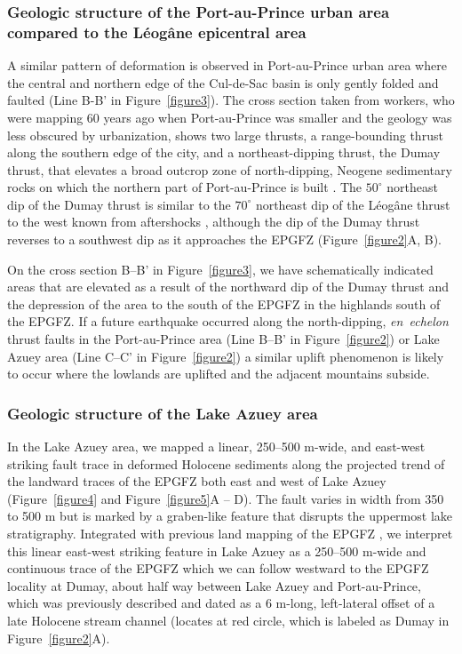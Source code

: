 \documentclass[linenumbers,draft]{agujournal}
\begin{document}
\subsubsection{Geologic structure of the Port-au-Prince urban area compared to the L\'eog\^ane epicentral area} 
A similar pattern of deformation is observed in Port-au-Prince urban area where the central and northern edge of the Cul-de-Sac basin is only gently folded and faulted \citep{massoni1955haiti,cox2011shear,mchugh2011offshore,saint2015seismotectonics} (Line B-B' in Figure~\ref{figure3}). The cross section taken from workers, who were mapping 60 years ago when Port-au-Prince was smaller and the geology was less obscured by urbanization, shows two large thrusts, a range-bounding thrust along the southern edge of the city, and a northeast-dipping thrust, the Dumay thrust, that elevates a broad outcrop zone of north-dipping, Neogene sedimentary rocks on which the northern part of Port-au-Prince is built \citep{rathje2014geotechnical}. The $50^{\circ}$ northeast dip of the Dumay thrust is similar to the $70^{\circ}$ northeast dip of the L\'eog\^ane thrust to the west known from aftershocks \citep{douilly2013crustal,douilly2015three}, although the dip of the Dumay thrust reverses to a southwest dip as it approaches the EPGFZ (Figure~\ref{figure2}A, B). 

On the cross section B--B' in Figure~\ref{figure3}, we have schematically indicated areas that are elevated as a result of the northward dip of the Dumay thrust and the depression of the area to the south of the EPGFZ in the highlands south of the EPGFZ. If a future earthquake occurred along the north-dipping, \textit{en~echelon} thrust faults in the Port-au-Prince area (Line B--B' in Figure~\ref{figure2}) or Lake Azuey area (Line C--C' in Figure~\ref{figure2}) a similar uplift phenomenon is likely to occur where the lowlands are uplifted and the adjacent mountains subside.

\subsubsection{Geologic structure of the Lake Azuey area} 
In the Lake Azuey area, we mapped a linear, 250--500 m-wide, and east-west striking fault trace in deformed Holocene sediments along the projected trend of the landward traces of the EPGFZ both east and west of Lake Azuey (Figure~\ref{figure4} and Figure~\ref{figure5}A -- D). The fault varies in width from 350 to 500 m but is marked by a graben-like feature that disrupts the uppermost lake stratigraphy. Integrated with previous land mapping of the EPGFZ \citep{bourgueil1988synthese,mann1995actively,prentice2010seismic,cowgill2012interactive}, we interpret this linear east-west striking feature in Lake Azuey as a 250--500 m-wide and continuous trace of the EPGFZ which we can follow westward to the EPGFZ locality at Dumay, about half way between Lake Azuey and Port-au-Prince, which was previously described and dated as a 6 m-long, left-lateral offset of a late Holocene stream channel \citep{cowgill2012interactive} (locates at red circle, which is labeled as Dumay in Figure~\ref{figure2}A). 
\end{document}
